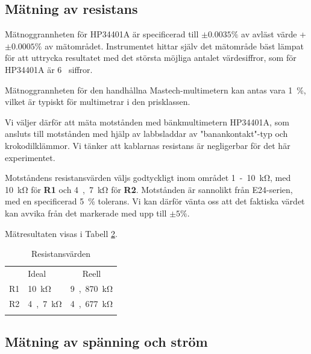 \documentclass[11pt,a4paper]{article}
\begin{document}
\subsection{Mätning av resistans}\label{vdiv}
\par Mätnoggrannheten för HP34401A är specificerad till $\pm{}0.0035\%$ av
avläst värde + $\pm{}0.0005\%$ av mätområdet. Instrumentet hittar själv det
mätområde bäst lämpat för att uttrycka resultatet med det största möjliga antalet
värdesiffror, som för HP34401A är \si{6} siffror.
\par Mätnoggrannheten för den handhållna Mastech-multimetern kan antas vara
\si{1\%}, vilket är typiskt för multimetrar i den prisklassen.
\par Vi väljer därför att mäta motstånden med bänkmultimetern HP34401A, som ansluts
till motstånden med hjälp av labbsladdar av "banankontakt"-typ och krokodilklämmor.
Vi tänker att kablarnas resistans är negligerbar för det här experimentet.
\\
\par Motståndens resistansvärden väljs godtyckligt inom området \si{1-10\kohm}, 
med \si{10\kohm} för \textbf{R1} och \si{4,7\kohm} för \textbf{R2}.
Motstånden är sannolikt från E24-serien, med en specificerad \si{5\%} tolerans. Vi kan
därför vänta oss att det faktiska värdet kan avvika från det markerade med upp till
$\pm{}5\%$. 
\par Mätresultaten visas i Tabell \ref{restable}.


\begin{table}
    \begin{longtable}[c]{@{}llc@{}}
        \toprule\addlinespace
           & Ideal         & Reell
        \\\addlinespace
        \midrule\endhead
        R1 & \si{10\kohm}  & \si{9,870\kohm}
        \\\addlinespace
        R2 & \si{4,7\kohm} & \si{4,677\kohm}
        \\\addlinespace
        \bottomrule
        \addlinespace
        \caption{Resistansvärden}
        \label{restable}
    \end{longtable}
\end{table}




\subsection{Mätning av spänning och ström}\label{meas_multi}
\end{document}
